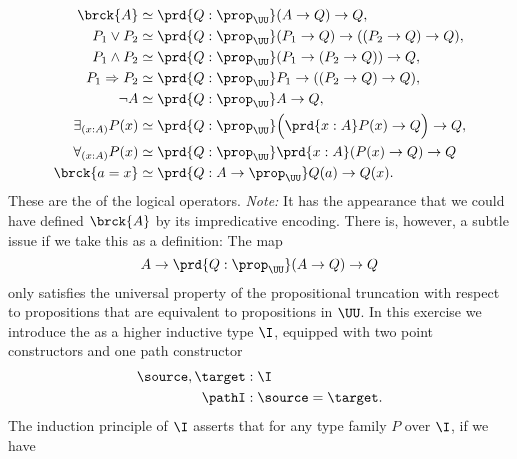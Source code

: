 \begin{exercises}
\begin{align*}
      \brck{A} & \simeq \prd{Q:\prop_\UU}(A\to Q)\to Q, \\
      P_1\lor P_2 & \simeq \prd{Q:\prop_\UU}(P_1\to Q) \to ((P_2\to Q)\to Q), \\
      P_1\land P_2 & \simeq \prd{Q:\prop_\UU}(P_1\to (P_2\to Q))\to Q, \\
      P_1\Rightarrow P_2 & \simeq \prd{Q:\prop_\UU}P_1\to ((P_2\to Q)\to Q), \\
      \neg A & \simeq \prd{Q:\prop_\UU} A\to Q, \\
      \exists_{(x:A)}P(x) & \simeq \prd{Q:\prop_\UU} \Big(\prd{x:A}P(x)\to Q\Big)\to Q, \\
      \forall_{(x:A)}P(x) & \simeq \prd{Q:\prop_\UU}\prd{x:A}(P(x)\to Q)\to Q\\
      \brck{a = x} & \simeq \prd{Q:A\to\prop_\UU} Q(a)\to Q(x).
    \end{align*}
    These are the  of the logical operators. \emph{Note:} It has the appearance that we could have defined $\brck{A}$ by its impredicative encoding. There is, however, a subtle issue if we take this as a definition: The map
    \begin{equation*}
      A\to\prd{Q:\prop_\UU}(A\to Q)\to Q
    \end{equation*}
    only satisfies the universal property of the propositional truncation with respect to propositions that are equivalent to propositions in $\UU$. 
  \exitem In this exercise we introduce the  as a higher inductive type $\I$, equipped with two point constructors and one path constructor
  \begin{align*}
    \source,\target & : \I \\
    \pathI & : \source=\target.
  \end{align*}
  The induction principle of $\I$ asserts that for any type family $P$ over $\I$, if we have
  \begin{align*}

\end{align*}
\end{exercises}
